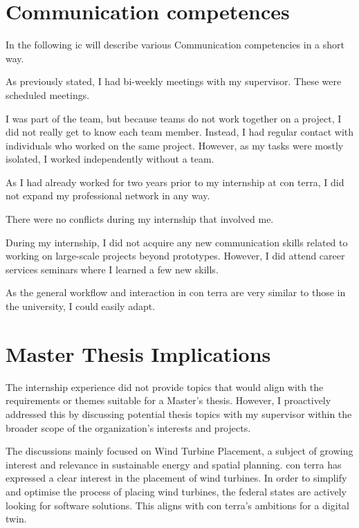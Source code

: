 \documentclass[11pt, titlepage, a4paper]{article}
\begin{document}
\section{Communication competences}
In the following ic will describe various Communication competencies in a short way.
\begin{description}[]
    \item[Supervisor Communication:] As previously stated, I had bi-weekly meetings with my supervisor. These were scheduled meetings.
    \item[Teamwork:] I was part of the team, but because teams do not work together on a project, I did not really get to know each team member. Instead, I had regular contact with individuals who worked on the same project. However, as my tasks were mostly isolated, I worked independently without a team.
    \item[Professional Network:] As I had already worked for two years prior to my internship at con terra, I did not expand my professional network in any way.
    \item[Conflicts:] There were no conflicts during my internship that involved me.
    \item[Communication Skills:]  During my internship, I did not acquire any new communication skills related to working on large-scale projects beyond prototypes. However, I did attend career services seminars where I learned a few new skills.
    \item[Applied Communication Skills:]  As the general workflow and interaction in con terra are very similar to those in the university, I could easily adapt.
\end{description}

\section{Master Thesis Implications}
The internship experience did not provide topics that would align with the requirements or themes suitable for a Master's thesis. However, I proactively addressed this by discussing potential thesis topics with my supervisor within the broader scope of the organization's interests and projects.

The discussions mainly focused on Wind Turbine Placement, a subject of growing interest and relevance in sustainable energy and spatial planning. con terra has expressed a clear interest in the placement of wind turbines. In order to simplify and optimise the process of placing wind turbines, the federal states are actively looking for software solutions. This aligns with con terra's ambitions for a digital twin.
\end{document}
